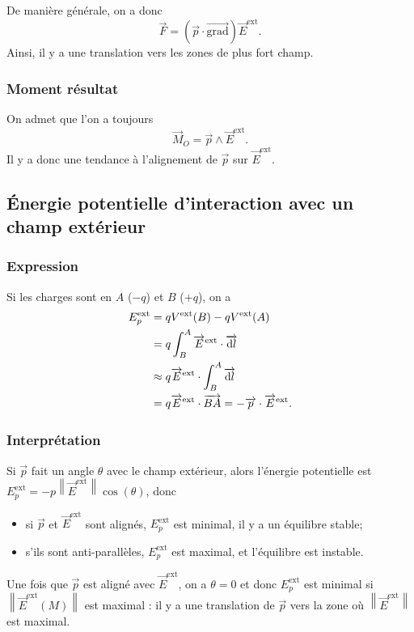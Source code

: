 De manière générale, on a donc
\begin{equation*}
    \boxed{
        \vec{F}=\left(\vec{p}\cdot\vec{\mathrm{grad}}\right)\vec{E}^{\mathrm{ext}}.
    }
\end{equation*}
Ainsi, il y a une translation vers les zones de plus fort champ.

\subsubsection{Moment résultat}

On admet que l'on a toujours
\begin{equation*}
    \boxed{
        \vec{M}_O=\vec{p}\wedge\vec{E}^{\mathrm{ext}}.
    }
\end{equation*}
Il y a donc une tendance à l'alignement de $\vec{p}$ sur $\vec{E}^{\mathrm{ext}}$.

\subsection{Énergie potentielle d'interaction avec un champ extérieur}
\subsubsection{Expression}
Si les charges sont en $A$ ($-q$) et $B$ ($+q$), on a 
\begin{align*}
    E_{p}^{\mathrm{ext}}
    &=
    qV^{\mathrm{ext}}(B)-qV^{\mathrm{ext}}(A)\\
    &=
    q\int_{B}^{A}\protect\overrightarrow{{E}}^{\mathrm{ext}}\cdot\protect\overrightarrow{{\mathrm{d} l}}\\
    &
    \approx q\protect\overrightarrow{{E}}^{\mathrm{ext}}\cdot\int_{B}^{A}\protect\overrightarrow{{\mathrm{d} l}}\\
    &=
    q\protect\overrightarrow{{E}}^{\mathrm{ext}}\cdot\protect\overrightarrow{{BA}}=-\protect\overrightarrow{{p}}\cdot\protect\overrightarrow{{E}}^{\mathrm{ext}}.
\end{align*}

\subsubsection{Interprétation}

Si $\vec{p}$ fait un angle $\theta$ avec le champ extérieur, alors l'énergie potentielle est~$E_p^{\mathrm{ext}}=-p\left\lVert\vec{E}^{\mathrm{ext}}\right\rVert\cos(\theta)$, donc
\begin{itemize}
    \item si $\vec{p}$ et $\vec{E}^{\mathrm{ext}}$ sont alignés, $E_p^{\mathrm{ext}}$ est minimal, il y a un équilibre stable;
    \item s'ils sont anti-parallèles, $E_p^{\mathrm{ext}}$ est maximal, et l'équilibre est instable.
\end{itemize}

Une fois que $\vec{p}$ est aligné avec $\vec{E}^{\mathrm{ext}}$, on a $\theta=0$ et donc $E_p^{\mathrm{ext}}$ est minimal si $\left\lVert\vec{E}^{\mathrm{ext}}(M)\right\rVert$ est maximal : il y a une translation de $\vec{p}$ vers la zone où $\left\lVert \vec{E}^{\mathrm{ext}}\right\rVert$ est maximal.